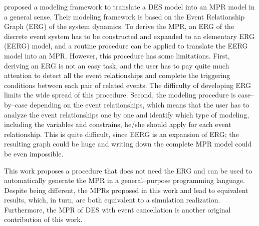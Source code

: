 \documentclass[]{interact}
\theoremstyle{plain}%
\theoremstyle{definition}
\theoremstyle{remark}
\begin{document}

\cite{chan2008optimization} proposed a modeling framework to translate a DES model into an MPR model in a general sense. Their modeling framework is based on the Event Relationship Graph (ERG) of the system dynamics. To derive the MPR, %
an ERG of the discrete event system has to be constructed and expanded to an elementary ERG (EERG) model, and a routine procedure can be applied to translate the EERG model into an MPR. %
However, this procedure has some limitations. First, deriving an ERG is not an easy task, and the user has to pay quite much attention to detect all the event relationships and complete the triggering conditions between each pair of related events. %
The difficulty of developing ERG limits the wide spread of this procedure. 
Second, the modeling procedure is case--by--case depending on the event relationships, which means that the user has to analyze the event relationships one by one and identify which type of modeling, including the variables and constrains, he/she should apply for each event relationship. 
This is quite %
difficult, since EERG is an expansion of ERG; the resulting graph could be huge and writing down the complete MPR model could be even impossible.  

This work proposes a procedure that does not need %
the ERG and %
can be used to automatically generate the MPR in a general--purpose programming language. Despite %
being different, the MPRs proposed in this work and \cite{chan2008optimization} lead to %
equivalent results, which, in turn, are both equivalent to a simulation realization. Furthermore, the MPR of DES with event cancellation is another original contribution of this work. 
\end{document}
